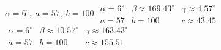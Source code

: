 { $\alpha = 6^{\circ}, \; a = 57, \; b = 100$}
{$\begin{array}{lll}\alpha = 6^{\circ} & \beta \approx 169.43^{\circ} & \gamma \approx 4.57^{\circ} \\a = 57 & b = 100 & c \approx 43.45 \end{array}$\\$\begin{array}{lll}\alpha = 6^{\circ} & \beta \approx 10.57^{\circ} & \gamma \approx 163.43^{\circ} \\a = 57 & b = 100 & c \approx 155.51 \end{array}$}
